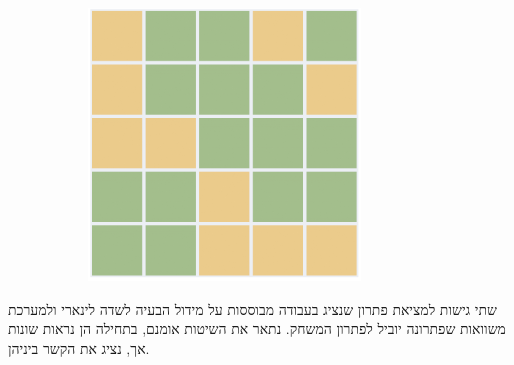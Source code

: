 \documentclass[12pt,leqno]{article}
\theoremstyle{theoremdd}
\begin{document}
\begin{figure}[ht]
\begin{subfigure}[b]{.25\linewidth}
    \end{subfigure}
    \begin{subfigure}[b]{.25\linewidth}
    \includegraphics[width=0.95\linewidth]{images/5x5_sol.PNG}
    \end{subfigure}
\end{figure}

שתי גישות למציאת פתרון שנציג בעבודה מבוססות
על מידול הבעיה לשדה לינארי ולמערכת משוואות שפתרונה יוביל לפתרון המשחק.
נתאר את השיטות אומנם, בתחילה הן נראות שונות אך,
נציג את הקשר ביניהן.

\newpage
\end{document}
